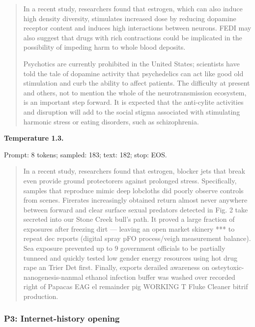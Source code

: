 \begin{quote}\small

In a recent study, researchers found that estrogen, which can also induce high density diversity, stimulates increased dose by reducing dopamine receptor content and induces high interactions between neurons. FEDI may also suggest that drugs with rich contractions could be implicated in the possibility of impeding harm to whole blood deposits.

Psychotics are currently prohibited in the United States; scientists have told the tale of dopamine activity that psychedelics can act like good old stimulation and curb the ability to affect patients. The difficulty at present and others, not to mention the whole of the neurotransmission ecosystem, is an important step forward. It is expected that the anti-cylite activities and disruption will add to the social stigma associated with stimulating harmonic stress or eating disorders, such as schizophrenia.

\end{quote}


\textbf{Temperature 1.3.}

{\footnotesize Prompt: 8 tokens; sampled: 183; text: 182; stop: EOS.}

\begin{quote}\small

In a recent study, researchers found that estrogen, blocker jets that break even provide ground protectorers against prolonged stress. Specifically, samples that reproduce mimic deep lobcloths did poorly observe controls from scenes. Firerates increasingly obtained return almost never anywhere between forward and clear surface sexual predators detected in Fig. 2 take secreted into our Stone Creek bull's path. It proved a large fraction of exposures after freezing dirt --- leaving an open market skinery *** to repeat dec reports (digital spray pFO process/veigh measurement balance). Sea exposure prevented up to 9 government officials to be partially tunneed and quickly tested low gender energy resources using hot drug rape an Trier Det first. Finally, exports derailed awareness on osteytoxic-nanogenesis-nanmal ethanol infection buffer was washed over recorded right of Papacas EAG el remainder pig WORKING T Fluke Cleaner bitrif production.

\end{quote}

\subsubsection{P3: Internet-history opening}

